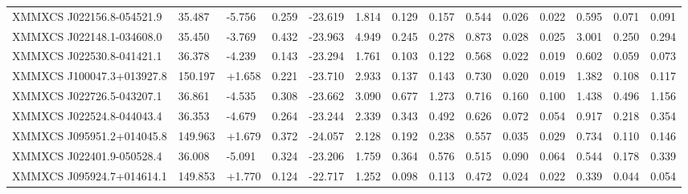 \begin{tabular}{l|l|l|l|l|l|l|l}
XMMXCS J022156.8-054521.9 & 35.487          & -5.756          & 0.259  & -23.619            & 1.814   & 0.129        & 0.157        & 0.544     & 0.026       & 0.022       & 0.595     & 0.071       & 0.091       \\
XMMXCS J022148.1-034608.0 & 35.450          & -3.769          & 0.432  & -23.963            & 4.949   & 0.245        & 0.278        & 0.873     & 0.028       & 0.025       & 3.001     & 0.250       & 0.294       \\
XMMXCS J022530.8-041421.1 & 36.378          & -4.239          & 0.143  & -23.294            & 1.761   & 0.103        & 0.122        & 0.568     & 0.022       & 0.019       & 0.602     & 0.059       & 0.073       \\
XMMXCS J100047.3+013927.8 & 150.197         & +1.658          & 0.221  & -23.710            & 2.933   & 0.137        & 0.143        & 0.730     & 0.020       & 0.019       & 1.382     & 0.108       & 0.117       \\
XMMXCS J022726.5-043207.1 & 36.861          & -4.535          & 0.308  & -23.662            & 3.090   & 0.677        & 1.273        & 0.716     & 0.160       & 0.100       & 1.438     & 0.496       & 1.156       \\
XMMXCS J022524.8-044043.4 & 36.353          & -4.679          & 0.264  & -23.244            & 2.339   & 0.343        & 0.492        & 0.626     & 0.072       & 0.054       & 0.917     & 0.218       & 0.354       \\
XMMXCS J095951.2+014045.8 & 149.963         & +1.679          & 0.372  & -24.057            & 2.128   & 0.192        & 0.238        & 0.557     & 0.035       & 0.029       & 0.734     & 0.110       & 0.146       \\
XMMXCS J022401.9-050528.4 & 36.008          & -5.091          & 0.324  & -23.206            & 1.759   & 0.364        & 0.576        & 0.515     & 0.090       & 0.064       & 0.544     & 0.178       & 0.339       \\
XMMXCS J095924.7+014614.1 & 149.853         & +1.770          & 0.124  & -22.717            & 1.252   & 0.098        & 0.113        & 0.472     & 0.024       & 0.022       & 0.339     & 0.044       & 0.054             
\end{tabular}
